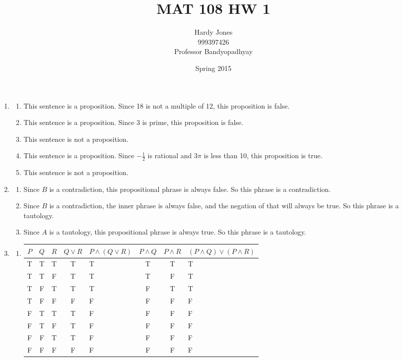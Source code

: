 \documentclass[12pt,letterpaper]{article}
\title{MAT 108 HW 1\vspace{-2ex}}
\author{Hardy Jones\\
        999397426\\
        Professor Bandyopadhyay\vspace{-2ex}}
\date{Spring 2015}
\begin{document}
  \maketitle

  \begin{enumerate}[label=Problem \arabic*]
    \item
      \begin{enumerate}[label=\arabic*.]
        \item This sentence is a proposition. Since 18 is not a multiple of 12, this proposition is false.
        \item This sentence is a proposition. Since 3 is prime, this proposition is false.
        \item This sentence is not a proposition.
        \item This sentence is a proposition. Since $-\frac{1}{2}$ is rational and $3\pi$ is less than 10, this proposition is true.
        \item This sentence is not a proposition.
      \end{enumerate}
    \item
      \begin{enumerate}[label=\arabic*.]
        \item Since $B$ is a contradiction, this propositional phrase is always false. So this phrase is a contradiction.
        \item Since $B$ is a contradiction, the inner phrase is always false, and the negation of that will always be true. So this phrase is a tautology.
        \item Since $A$ is a tautology, this propositional phrase is always true. So this phrase is a tautology.
      \end{enumerate}
    \item
      \begin{enumerate}[label=\arabic*.]
        \item

          \begin{tabular}{c | c | c | c | g | c | c | g}
            $P$ & $Q$ & $R$ & $Q \vee R$ & $P \wedge (Q \vee R)$ & $P \wedge Q$ & $P \wedge R$ & $(P \wedge Q) \vee (P \wedge R)$ \\
            \hline
            T & T & T & T & T & T & T & T \\
            T & T & F & T & T & T & F & T \\
            T & F & T & T & T & F & T & T \\
            T & F & F & F & F & F & F & F \\
            F & T & T & T & F & F & F & F \\
            F & T & F & T & F & F & F & F \\
            F & F & T & T & F & F & F & F \\
            F & F & F & F & F & F & F & F \\
          \end{tabular}


\end{enumerate}
\end{enumerate}
\end{document}

